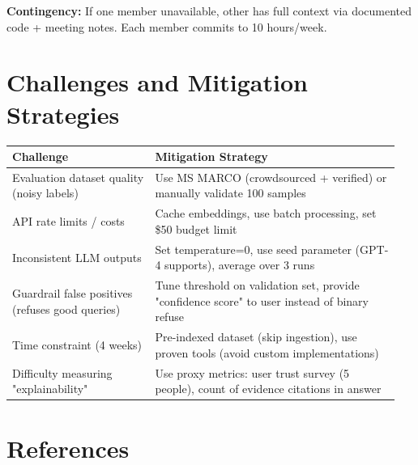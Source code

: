 \documentclass[11pt,a4paper]{article}
\begin{document}
\textbf{Contingency:} If one member unavailable, other has full context via documented code + meeting notes. Each member commits to 10 hours/week.

\section{Challenges and Mitigation Strategies}

\begin{table}[h]
\centering
\small
\begin{tabular}{@{}p{0.35\linewidth}p{0.6\linewidth}@{}}
\toprule
\textbf{Challenge} & \textbf{Mitigation Strategy} \\ \midrule
Evaluation dataset quality (noisy labels) & Use MS MARCO (crowdsourced + verified) or manually validate 100 samples \\
API rate limits / costs & Cache embeddings, use batch processing, set \$50 budget limit \\
Inconsistent LLM outputs & Set temperature=0, use seed parameter (GPT-4 supports), average over 3 runs \\
Guardrail false positives (refuses good queries) & Tune threshold on validation set, provide "confidence score" to user instead of binary refuse \\
Time constraint (4 weeks) & Pre-indexed dataset (skip ingestion), use proven tools (avoid custom implementations) \\
Difficulty measuring "explainability" & Use proxy metrics: user trust survey (5 people), count of evidence citations in answer \\
\bottomrule
\end{tabular}
\end{table}

\section{References}
\end{document}
